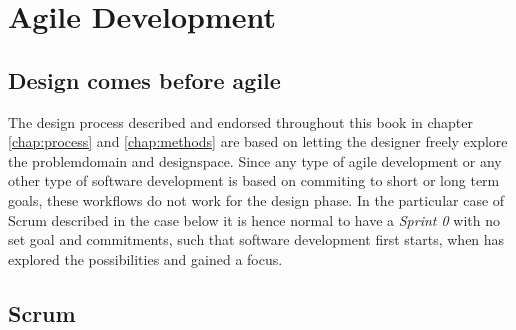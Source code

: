 \section{Agile Development} \label{sec:agile_development}

\begin{concept} \label{conc:agile} 
  
\end{concept}

\subsection{Design comes before agile} \label{sec:design_before_agile}
The design process described and endorsed throughout this book in chapter \ref{chap:process} and \ref{chap:methods} are based on letting the designer freely explore the problemdomain and designspace. Since any type of agile development or any other type of software development is based on commiting to short or long term goals, these workflows do not work for the design phase. In the particular case of Scrum described in the case below it is hence normal to have a \emph{Sprint 0} with no set goal and commitments, such that software development first starts, when has explored the possibilities and gained a focus.

\subsection{Scrum} \label{sec:scrum} 

\begin{definition} \label{def:product_owner} 

\end{definition}

\begin{definition} \label{def:scrum_master} 

\end{definition}

\begin{definition} \label{def:product_backlog} 

\end{definition}

\begin{definition}[Sprint] \label{def:sprint} 

\end{definition}

